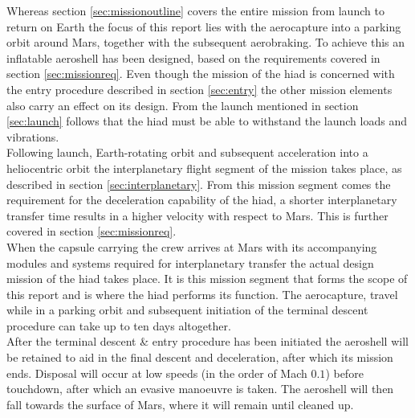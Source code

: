 Whereas section \ref{sec:missionoutline} covers the entire mission from launch to return on Earth the focus of this report lies with the aerocapture into a parking orbit around Mars, together with the subsequent aerobraking. To achieve this an inflatable aeroshell has been designed, based on the requirements covered in section \ref{sec:missionreq}. Even though the mission of the \gls{hiad} is concerned with the entry procedure described in section \ref{sec:entry} the other mission elements also carry an effect on its design. From the launch mentioned in section \ref{sec:launch} follows that the \gls{hiad} must be able to withstand the launch loads and vibrations. \\
Following launch, Earth-rotating orbit and subsequent acceleration into a heliocentric orbit the interplanetary flight segment of the mission takes place, as described in section \ref{sec:interplanetary}. From this mission segment comes the requirement for the deceleration capability of the \gls{hiad}, a shorter interplanetary transfer time results in a higher velocity with respect to Mars. This is further covered in section \ref{sec:missionreq}. \\
When the capsule carrying the crew arrives at Mars with its accompanying modules and systems required for interplanetary transfer the actual design mission of the \gls{hiad} takes place. It is this mission segment that forms the scope of this report and is where the \gls{hiad} performs its function. The aerocapture, travel while in a parking orbit and subsequent initiation of the terminal descent procedure can take up to ten days altogether. \\
After the terminal descent \& entry procedure has been initiated the aeroshell will be retained to aid in the final descent and deceleration, after which its mission ends. Disposal will occur at low speeds (in the order of Mach $0.1$) before touchdown, after which an evasive manoeuvre is taken. The aeroshell will then fall towards the surface of Mars, where it will remain until cleaned up.